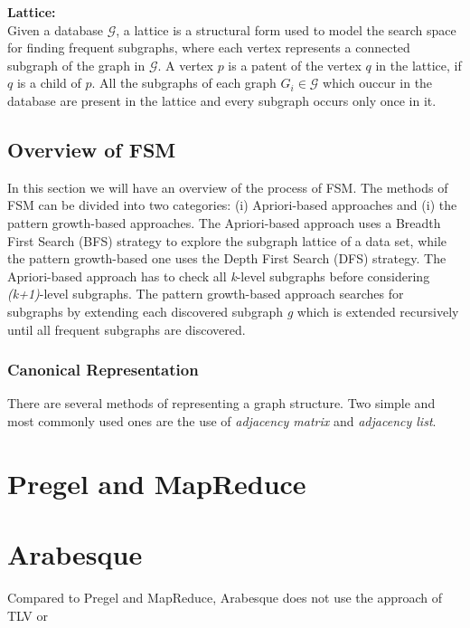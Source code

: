 \documentclass[12pt,a4paper]{article}
\begin{document}
\begin{samepage}
\noindent \textbf{Lattice:}\\
Given a database $\mathcal{G}$, a lattice is a structural form used to model the search space for finding frequent subgraphs, where each vertex represents a connected subgraph of the graph in $\mathcal{G}$. 
A vertex $p$ is a patent of the vertex $q$ in the lattice, if $q$ is a child of $p$. All the subgraphs of each graph $G_{i} \in \mathcal{G}$ which ouccur in the database are present in the lattice and every subgraph occurs only once in it.\\


\end{samepage}




\subsection{Overview of FSM}
In this section we will have an overview of the process of FSM. 
The methods of FSM can be divided into two categories: (i) Apriori-based approaches and (i) the pattern growth-based approaches.
The Apriori-based approach uses a Breadth First Search (BFS) strategy to explore the subgraph lattice of a data set, while the pattern growth-based one uses the Depth First Search (DFS) strategy.
The Apriori-based approach has to check all \textit{k}-level subgraphs before considering \textit{(k+1)}-level subgraphs.
The pattern growth-based approach searches for subgraphs by extending each discovered subgraph \textit{g} which is extended recursively until all frequent subgraphs are discovered.

\subsubsection{Canonical Representation}
There are several methods of representing a graph structure. Two simple and most commonly used ones are the use of \textit{adjacency matrix} and \textit{adjacency list}.


\section{Pregel and MapReduce}
\section{Arabesque}
Compared to Pregel and MapReduce, Arabesque does not use the approach of TLV or 
\end{document}
